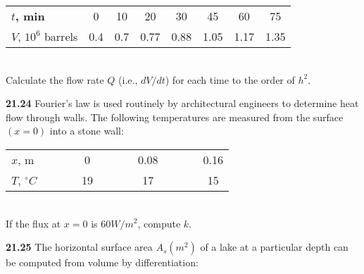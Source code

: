 \documentclass[../main.tex]{subfiles}
\begin{document}
\begin{multicols}{2}
\begin{tabular}{lccccccc}
	\scriptsize{\textbf{$t$, min}} & \scriptsize{0} & \scriptsize{10} & \scriptsize{20} & \scriptsize{30} & \scriptsize{45} & \scriptsize{60} & \scriptsize{75}\\
	
	\scriptsize{$V$, $10^{6}$ barrels} & \scriptsize{0.4} & \scriptsize{0.7} & \scriptsize{0.77} & \scriptsize{0.88} & \scriptsize{1.05} & \scriptsize{1.17} & \scriptsize{1.35}\\

	\hline
\end{tabular}\\
Calculate the flow rate $Q$ (i.e., $dV/dt$) for each time to the
order of $h^{2}$.

\textbf{21.24} Fourier's law is used routinely by architectural engineers to determine heat flow through walls. The following
temperatures are measured from the surface $(x = 0)$ into a
stone wall: \\
\begin{tabular}{lcccccccccccc}
	\hline

	$x$, m & \vspace{0,1in} & \vspace{0,1in} & \vspace{0,1in} & 0 & \vspace{0,1in} & \vspace{0,1in} & \vspace{0,1in} & 0.08 & \vspace{0,1in} & \vspace{0,1in} & \vspace{0,1in} & 0.16\\
	
	$T$, $^{\circ}C$ & \vspace{0,1in} & \vspace{0,1in} & \vspace{0,1in} & 19 & \vspace{0,1in} & \vspace{0,1in} & \vspace{0,1in} & 17 & \vspace{0,1in} & \vspace{0,1in} & \vspace{0,1in} & 15\\


	\hline
\end{tabular}\\
If the flux at $x = 0$ is $60 W/m^2$, compute $k$.

\textbf{21.25} The horizontal surface area $A_{s} (m^2)$ of a lake at a particular depth can be computed from volume by differentiation: 


\end{multicols}
\end{document}
